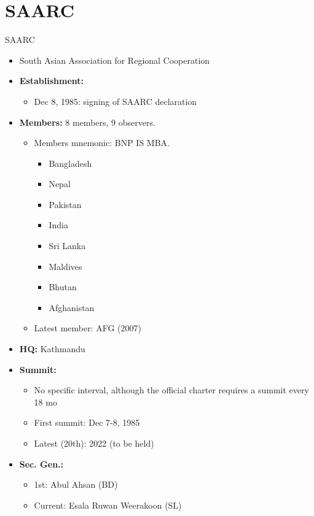 \documentclass[
  12pt,
  ignorenonframetext,
  progressbar=frametitle]{beamer}
\providecommand{\tightlist}{%
  \setlength{\itemsep}{0pt}\setlength{\parskip}{0pt}}
\begin{document}
\section{SAARC}
\begin{frame}[allowframebreaks]
{SAARC}
\protect\hypertarget{saarc}{}
\begin{itemize}
\tightlist
\item
  South Asian Association for Regional Cooperation
\item
  \textbf{Establishment:}

  \begin{itemize}
  \tightlist
  \item
    Dec 8, 1985: signing of SAARC declaration
  \end{itemize}
\item
  \textbf{Members:} 8 members, 9 observers.

  \begin{itemize}
  \tightlist
  \item
    Members mnemonic: BNP IS MBA.

    \begin{itemize}
    \tightlist
    \item
      Bangladesh
    \item
      Nepal
    \item
      Pakistan
    \item
      India
    \item
      Sri Lanka
    \item
      Maldives
    \item
      Bhutan
    \item
      Afghanistan
    \end{itemize}
  \item
    Latest member: AFG (2007)
  \end{itemize}
\item
  \textbf{HQ:} Kathmandu
\item
  \textbf{Summit:}

  \begin{itemize}
  \tightlist
  \item
    No specific interval, although the official charter requires a
    summit every 18 mo
  \item
    First summit: Dec 7-8, 1985
  \item
    Latest (20th): 2022 (to be held)
  \end{itemize}
\item
  \textbf{Sec. Gen.:}

  \begin{itemize}
  \tightlist
  \item
    1st: Abul Ahsan (BD)
  \item
    Current: Esala Ruwan Weerakoon (SL)
  \end{itemize}
\end{itemize}
\end{frame}
\end{document}

